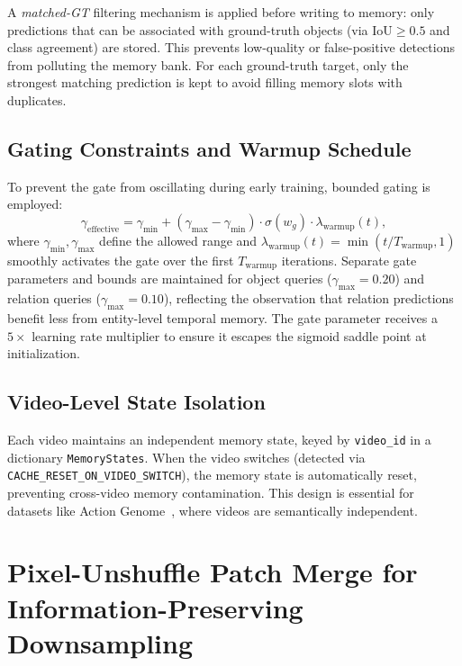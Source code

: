 A \textit{matched-GT} filtering mechanism is applied before writing to memory: only predictions that can be associated with ground-truth objects (via $\mathrm{IoU} \geq 0.5$ and class agreement) are stored. This prevents low-quality or false-positive detections from polluting the memory bank. For each ground-truth target, only the strongest matching prediction is kept to avoid filling memory slots with duplicates.

\subsection{Gating Constraints and Warmup Schedule}

To prevent the gate from oscillating during early training, bounded gating is employed:
\begin{equation}
\gamma_{\mathrm{effective}} = \gamma_{\mathrm{min}} + (\gamma_{\mathrm{max}} - \gamma_{\mathrm{min}}) \cdot \sigma(w_g) \cdot \lambda_{\mathrm{warmup}}(t),
\end{equation}
where $\gamma_{\mathrm{min}}, \gamma_{\mathrm{max}}$ define the allowed range and $\lambda_{\mathrm{warmup}}(t) = \min(t / T_{\mathrm{warmup}}, 1)$ smoothly activates the gate over the first $T_{\mathrm{warmup}}$ iterations. Separate gate parameters and bounds are maintained for object queries ($\gamma_{\mathrm{max}} = 0.20$) and relation queries ($\gamma_{\mathrm{max}} = 0.10$), reflecting the observation that relation predictions benefit less from entity-level temporal memory. The gate parameter receives a $5\times$ learning rate multiplier to ensure it escapes the sigmoid saddle point at initialization.

\subsection{Video-Level State Isolation}

Each video maintains an independent memory state, keyed by \texttt{video\_id} in a dictionary \texttt{MemoryStates}. When the video switches (detected via \texttt{CACHE\_RESET\_ON\_VIDEO\_SWITCH}), the memory state is automatically reset, preventing cross-video memory contamination. This design is essential for datasets like Action Genome~\cite{ji2020action}, where videos are semantically independent.


\section{Pixel-Unshuffle Patch Merge for Information-Preserving Downsampling}

